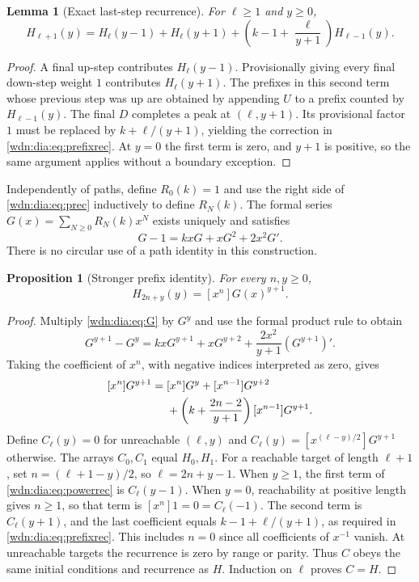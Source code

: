 \documentclass[11pt,letterpaper]{article}
\newtheorem{lemma}[theorem]{Lemma}
\newtheorem{proposition}[theorem]{Proposition}
\theoremstyle{remark}\newtheorem{remark}[theorem]{Remark}
\begin{document}
\begin{lemma}[Exact last-step recurrence]\label{wdn:dia:lem:prefixrec}
For $\ell\ge1$ and $y\ge0$,
\begin{equation}\label{wdn:dia:eq:prefixrec}
 H_{\ell+1}(y)=H_\ell(y-1)+H_\ell(y+1)
 +\left(k-1+\frac\ell{y+1}\right)H_{\ell-1}(y).
\end{equation}
\end{lemma}
\begin{proof}
A final up-step contributes $H_\ell(y-1)$. Provisionally giving every final
down-step weight $1$ contributes $H_\ell(y+1)$. The prefixes in this second
term whose previous step was up are obtained by appending $U$ to a prefix
counted by $H_{\ell-1}(y)$. The final $D$ completes a peak at $(\ell,y+1)$.
Its provisional factor $1$ must be replaced by $k+\ell/(y+1)$, yielding the
correction in \eqref{wdn:dia:eq:prefixrec}. At $y=0$ the first term is zero, and
$y+1$ is positive, so the same argument applies without a boundary exception.
\end{proof}

Independently of paths, define $R_0(k)=1$ and use the right side of
\eqref{wdn:dia:eq:prec} inductively to define $R_N(k)$. The formal series
$G(x)=\sum_{N\ge0}R_N(k)x^N$ exists uniquely and satisfies
\begin{equation}\label{wdn:dia:eq:G}
 G-1=kxG+xG^2+2x^2G'.
\end{equation}
There is no circular use of a path identity in this construction.

\begin{proposition}[Stronger prefix identity]\label{wdn:dia:prop:prefix}
For every $n,y\ge0$,
\begin{equation}\label{wdn:dia:eq:prefix}
 H_{2n+y}(y)=[x^n]G(x)^{y+1}.
\end{equation}
\end{proposition}
\begin{proof}
Multiply \eqref{wdn:dia:eq:G} by $G^y$ and use the formal product rule to obtain
\[
 G^{y+1}-G^y=kxG^{y+1}+xG^{y+2}
 +\frac{2x^2}{y+1}(G^{y+1})'.
\]
Taking the coefficient of $x^n$, with negative indices interpreted as zero,
gives
\begin{align}\label{wdn:dia:eq:powerrec}
 [x^n]G^{y+1}={}&[x^n]G^y+[x^{n-1}]G^{y+2}\notag\\
 &+\left(k+\frac{2n-2}{y+1}\right)[x^{n-1}]G^{y+1}.
\end{align}
Define $C_\ell(y)=0$ for unreachable $(\ell,y)$ and
$C_\ell(y)=[x^{(\ell-y)/2}]G^{y+1}$ otherwise. The arrays $C_0,C_1$ equal
$H_0,H_1$. For a reachable target of length $\ell+1$, set
$n=(\ell+1-y)/2$, so $\ell=2n+y-1$. When $y\ge1$, the first term of
\eqref{wdn:dia:eq:powerrec} is $C_\ell(y-1)$. When $y=0$, reachability at positive
length gives $n\ge1$, so that term is $[x^n]1=0=C_\ell(-1)$. The second term
is $C_\ell(y+1)$, and the last coefficient equals
$k-1+\ell/(y+1)$, as required in \eqref{wdn:dia:eq:prefixrec}. This includes $n=0$
since all coefficients of $x^{-1}$ vanish. At unreachable targets the
recurrence is zero by range or parity. Thus $C$ obeys the same initial
conditions and recurrence as $H$. Induction on $\ell$ proves $C=H$.
\end{proof}
\end{document}
